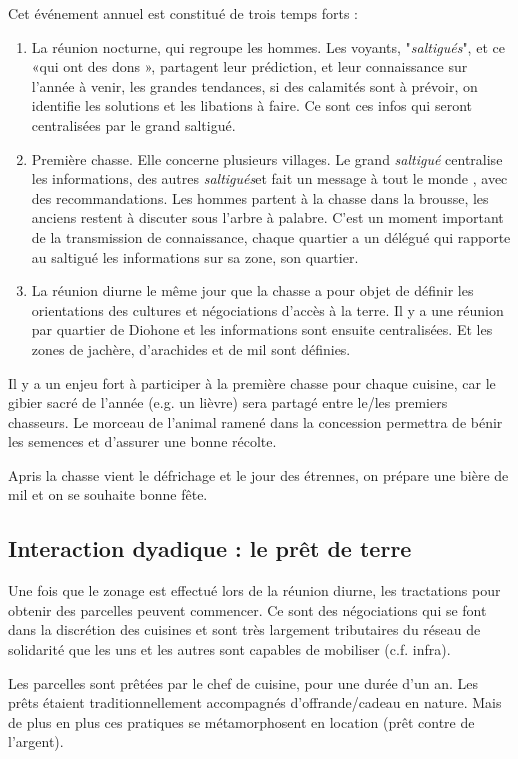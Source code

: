 Cet événement annuel est constitué de trois temps forts :
\begin{enumerate}
  \item La réunion nocturne, qui regroupe les hommes. Les voyants, "\textit{saltigués}", et ce «qui ont des dons », partagent leur prédiction, et leur connaissance sur l'année à venir, les grandes tendances, si des calamités sont à prévoir, on identifie les solutions et les libations à faire. Ce sont ces infos qui seront centralisées par le grand saltigué.
  \item Première chasse. Elle concerne plusieurs villages.  Le grand \textit{saltigué} centralise les informations, des autres \textit{saltigués}et fait un message à tout le monde , avec des recommandations. Les hommes partent à la chasse dans la brousse, les anciens restent à discuter sous l'arbre à palabre. C'est un moment important de la transmission de connaissance, chaque quartier a un délégué qui rapporte au saltigué les informations sur sa zone, son quartier.
  \item La réunion diurne le même jour que la chasse a pour objet de définir les orientations des cultures et négociations d'accès à la terre. Il y a une réunion par quartier de Diohone et les informations sont ensuite centralisées. Et les zones de jachère, d'arachides et de mil sont définies.
\end{enumerate}

Il y a un enjeu fort à participer à la première chasse pour chaque cuisine, car le gibier sacré de l'année (e.g. un lièvre) sera partagé entre le/les premiers chasseurs. Le morceau de l'animal ramené dans la concession permettra de bénir les semences et d'assurer une bonne récolte.

Apris la chasse vient le défrichage  et  le jour des étrennes, on prépare une bière de mil et on se souhaite bonne fête.


\subsection{Interaction dyadique : le prêt de terre}

Une fois que le zonage est effectué lors de la réunion diurne, les tractations pour obtenir des parcelles  peuvent commencer. Ce sont des négociations qui se font dans la discrétion des cuisines et sont très largement tributaires du réseau de solidarité que les uns et les autres sont capables de mobiliser (c.f. infra).

Les parcelles sont prêtées par le chef de cuisine, pour une durée d'un an. Les prêts étaient traditionnellement accompagnés d'offrande/cadeau en nature. Mais de plus en plus ces pratiques se métamorphosent en location (prêt contre de l'argent).

